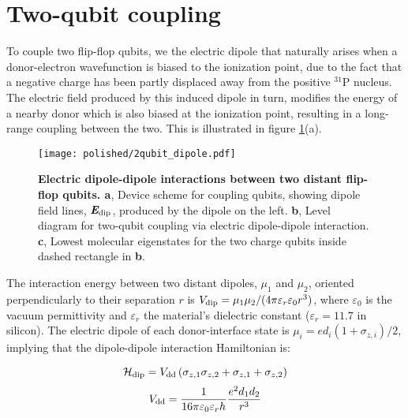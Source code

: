 \section{Two-qubit coupling}

To couple two flip-flop qubits, we the electric dipole that naturally arises when a donor-electron wavefunction is biased to the ionization point, due to the fact that a negative charge has been partly displaced away from the positive $^{31}$P nucleus. The electric field produced by this induced dipole in turn, modifies the energy of a nearby donor which is also biased at the ionization point, resulting in a long-range coupling between the two. This is illustrated in figure \ref{fig:dipole}(a).

\begin{figure}[h]
	\centering
	\texttt{[image: polished/2qubit\_dipole.pdf]}
	\caption[Electric dipole-dipole interactions between two distant flip-flop qubits]{\textbf{Electric dipole-dipole interactions between two distant flip-flop qubits. a}, Device scheme for coupling qubits, showing dipole field lines, $\textit{\textbf{E}}_{\rm dip}$, produced by the dipole on the left.
		\textbf{b}, Level diagram for two-qubit coupling via electric dipole-dipole interaction.
		\textbf{c}, Lowest molecular eigenstates for the two charge qubits inside dashed rectangle in \textbf{b}.}
	\label{fig:dipole}
\end{figure}

The interaction energy between two distant dipoles, $\mu_1$ and $\mu_2$, oriented perpendicularly to their separation $r$ is $V_{\rm dip}=\mu_1\mu_2/(4\pi\varepsilon_r\varepsilon_0r^3)$, where $\varepsilon_0$ is the vacuum permittivity and $\varepsilon_r$ the material's dielectric constant ($\varepsilon_r=11.7$ in silicon)\cite{Ravets2014}. The electric dipole of each donor-interface state is $\mu_i=ed_i(1+\sigma_{z,i})/2$, implying that the dipole-dipole interaction Hamiltonian is:

\begin{equation} \label{eq:H_dipdip}
\mathcal{H}_{\rm dip}=V_{\rm dd}\left(\sigma_{z,1}\sigma_{z,2}+\sigma_{z,1}+\sigma_{z,2}\right)
\end{equation}
\begin{equation} \label{eq:V_dd}
V_{\rm dd}=\frac{1}{16\pi\varepsilon_0\varepsilon_r h}\frac{e^2d_1 d_2}{r^3}
\end{equation}


